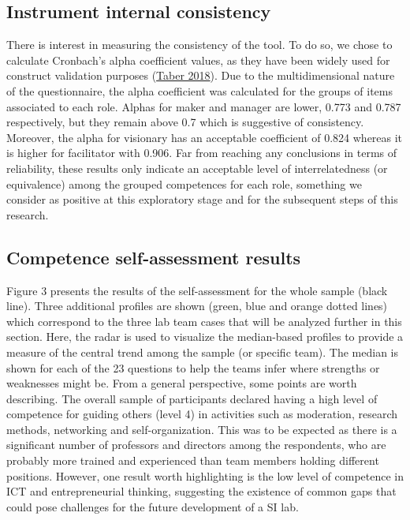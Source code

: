 \documentclass[AMA,STIX1COL,APA,STIX2COL]{WileyNJD-v2}
\begin{document}
\hypertarget{instrument-internal-consistency}{%
\subsection{Instrument internal
consistency}\label{instrument-internal-consistency}}

There is interest in measuring the consistency of the tool. To do so, we
chose to calculate Cronbach's alpha coefficient values, as they have
been widely used for construct validation purposes
(\protect\hyperlink{ref-Taber2018}{Taber 2018}). Due to the
multidimensional nature of the questionnaire, the alpha coefficient was
calculated for the groups of items associated to each role. Alphas for
maker and manager are lower, 0.773 and 0.787 respectively, but they
remain above 0.7 which is suggestive of consistency. Moreover, the alpha
for visionary has an acceptable coefficient of 0.824 whereas it is
higher for facilitator with 0.906. Far from reaching any conclusions in
terms of reliability, these results only indicate an acceptable level of
interrelatedness (or equivalence) among the grouped competences for each
role, something we consider as positive at this exploratory stage and
for the subsequent steps of this research.

\hypertarget{competence-self-assessment-results}{%
\subsection{Competence self-assessment
results}\label{competence-self-assessment-results}}

Figure 3 presents the results of the self-assessment for the whole
sample (black line). Three additional profiles are shown (green, blue
and orange dotted lines) which correspond to the three lab team cases
that will be analyzed further in this section. Here, the radar is used
to visualize the median-based profiles to provide a measure of the
central trend among the sample (or specific team). The median is shown
for each of the 23 questions to help the teams infer where strengths or
weaknesses might be. From a general perspective, some points are worth
describing. The overall sample of participants declared having a high
level of competence for guiding others (level 4) in activities such as
moderation, research methods, networking and self-organization. This was
to be expected as there is a significant number of professors and
directors among the respondents, who are probably more trained and
experienced than team members holding different positions. However, one
result worth highlighting is the low level of competence in ICT and
entrepreneurial thinking, suggesting the existence of common gaps that
could pose challenges for the future development of a SI lab.
\end{document}
